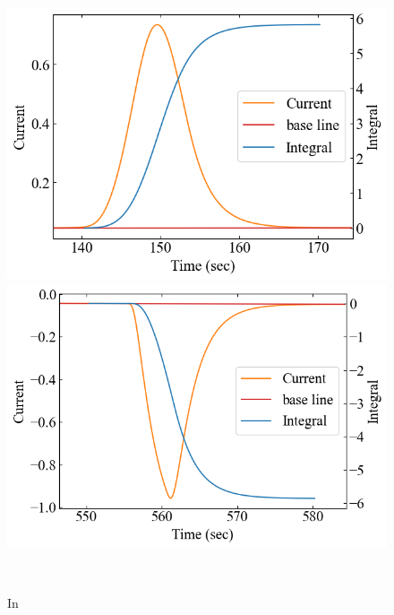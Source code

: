 \documentclass[9pt,dvipdfmx,a4paper]{jsarticle}
\begin{document}
\begin{figure}[hbt]
\begin{minipage}[t]{0.245\columnwidth}
        \includegraphics[width = \columnwidth]{appendix/In-dSdt-heat.png}
    \end{minipage}
    \hfill
    \begin{minipage}[t]{0.245\columnwidth}
        \centering
        \includegraphics[width = \columnwidth]{appendix/In-dSdt-cool.png}
    \end{minipage}\\
    \caption{In}


\end{figure}
\end{document}
